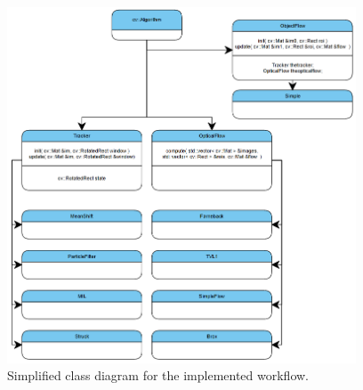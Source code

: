    \begin{figure}[thbp]
      \centering
      \includegraphics[width=0.925\textwidth]{../images/ClassDiagram.png}
      \caption{Simplified class diagram for the implemented workflow.}
      \label{class}
   \end{figure}


